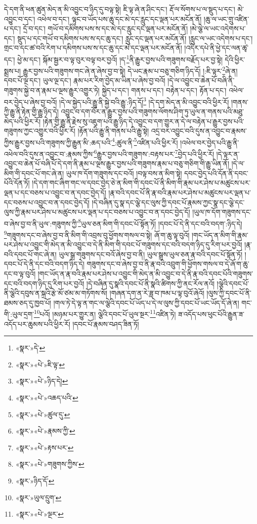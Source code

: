 དེ་དག་ནི་ཕན་ཚུན་མེད་ན་མི་འབྱུང་བ་ཉིད་དུ་བལྟ་སྟེ། ཇི་ལྟ་ཞེ་ན་ཤིང་དང་། རྡོ་ལ་སོགས་པ་ལ་སྡུད་པ་དང་། མེ་འབྱུང་བ་དང་། འཕེལ་བ་དང་། ལྟུང་བ་ཡོད་པས་ཆུ་དང་མེ་དང་རླུང་དང་ལྡན་པར་མངོན་ནོ། །ཆུ་ལ་ཡང་གྲུ་འཛིན་པ་དང་། དྲོ་བ་དང་། གཡོ་བ་དམིགས་པས་ས་དང་མེ་དང་རླུང་དང་ལྡན་པར་མངོན་ནོ། །མེ་ལྕེ་ལ་ཡང་འདེགས་པ་དང་། སྡུད་པ་དང་གཡོ་བ་དམིགས་པས་ས་དང་ཆུ་དང་། རླུང་དང་ལྡན་པར་མངོན་ནོ། །རླུང་ལ་ཡང་འདེགས་པ་དང་། གྲང་བ་དང་ཚ་བའི་རེག་པ་དམིགས་པས་ས་དང་ཆུ་དང་མེ་དང་ལྡན་པར་མངོན་ནོ། །འདིར་དཔེ་ནི་ཕྱེ་དང་ལན་ཚྭ་དང་། ཕྱེ་མ་དང་། སྐོམ་སྦྱར་བ་ལྟ་བུར་བལྟ་བར་བྱའོ། །ད་\footnote{«སྣར་»དེ་}ནི་རྒྱུར་བྱས་པའི་གཟུགས་བརྗོད་པར་བྱ་སྟེ། དེའི་ཕྱིར་སྨྲས་པ། རྒྱུར་བྱས་པའི་གཟུགས་གང་ཞེ་ན་ཞེས་བྱ་བ་སྟེ། དེ་ཡང་རྣམ་པ་བཅུ་གཅིག་ཉིད་དོ། །:ཇི་ལྟར་\footnote{«སྣར་»«པེ་»ཇི་ལྟ་}ཞེ་ན། དབང་པོ་ལྔ་དང་། ཡུལ་ལྔ་དང་། རྣམ་པར་རིག་བྱེད་མ་ཡིན་པ་ཞེས་བྱ་བའོ། །དེ་ལ་འབྱུང་བ་ཆེན་པོ་བཞི་ནི་གཟུགས་སྐྱེ་བ་ན་རྣམ་པ་ལྔས་རྒྱུར་འགྱུར་ཏེ། སྐྱེད་པ་དང་། གནས་པ་དང་། བརྟེན་པ་དང་། རྟོན་པ་དང་། འཕེལ་བར་བྱེད་པ་ཞེས་བྱ་བའོ། །དེ་ལ་སྐྱེད་པའི་རྒྱུ་ནི་སྐྱེ་བའི་རྒྱུ་:ཉིད་དོ།\footnote{«སྣར་»«པེ་»ཉིད་དེ།} །དེ་དག་མེད་ན་མི་འབྱུང་བའི་ཕྱིར་རོ། །གནས་ཀྱི་རྒྱུ་ནི་རྟེན་གྱི་རྒྱུ་ཉིད་དེ། འབྱུང་བ་དག་བོར་ན་རྒྱུར་བྱས་པའི་གཟུགས་ལོགས་ཤིག་ཏུ་ཡུལ་ན་གནས་པའི་མཐུ་མེད་པའི་ཕྱིར་རོ། །རྟེན་གྱི་རྒྱུ་ནི་རྗེས་སུ་འཇུག་པའི་རྒྱུ་ཉིད་དེ་འབྱུང་བ་དག་གྱུར་ན་དེ་ལ་བརྟེན་པ་རྒྱུར་བྱས་པའི་གཟུགས་ཀྱང་འགྱུར་བའི་ཕྱིར་རོ། །རྟོན་པའི་རྒྱུ་ནི་གནས་པའི་རྒྱུ་སྟེ། འདྲ་བར་འབྱུང་བའི་དུས་ན་འབྱུང་བ་རྣམས་ཀྱིས་རྒྱུར་བྱས་པའི་གཟུགས་ཀྱི་རྒྱུན་མི་:ཆད་པའི་\footnote{«སྣར་»«པེ་»འཆད་པའི་}:ཚུལ་ནི་\footnote{«སྣར་»«པེ་»ཚུལ་དུ་}འཛིན་པའི་ཕྱིར་རོ། །འཕེལ་བར་བྱེད་པའི་རྒྱུ་ནི་འཕེལ་བའི་དུས་ན་འབྱུང་བ་:རྣམས་ཀྱིས་\footnote{«སྣར་»«པེ་»རྣམས་ཀྱི་}རྒྱུར་བྱས་པའི་གཟུགས་:བརྟས་པར་\footnote{«སྣར་»«པེ་»རྟས་པར་}བྱེད་པའི་ཕྱིར་རོ། །དེ་ལྟར་ན་འབྱུང་བ་ཆེན་པོ་བཞི་པོ་དེ་དག་ནི་རྣམ་པ་ལྔས་རྒྱུར་བྱས་པའི་གཟུགས་རྣམ་པ་བཅུ་གཅིག་གི་རྒྱུ་ཡིན་ནོ། །དེ་ལ་མིག་གི་དབང་པོ་གང་ཞེ་ན། ཡུལ་ཁ་དོག་གཟུགས་དང་བའོ། །བལྟ་བས་ན་མིག་སྟེ། དབང་བྱེད་པའི་དོན་ནི་དབང་པོའི་དོན་ཏོ། །དེ་དག་གང་ཞིག་གང་ལ་དབང་བྱེད་ཅེ་ན་མིག་གི་དབང་པོ་ནི་མིག་གི་རྣམ་པར་ཤེས་པ་མཚུངས་པར་ལྡན་པ་དང་བཅས་པ་འབྱུང་བ་ན་དབང་བྱེད་དོ། །རྣ་བའི་དབང་པོ་ནི་རྣ་བའི་རྣམ་པར་ཤེས་པ་མཚུངས་པར་ལྡན་པ་དང་བཅས་པ་འབྱུང་བ་ན་དབང་བྱེད་དོ། །དེ་བཞིན་དུ་སྣ་དང་ལྕེ་དང་ལུས་ཀྱི་དབང་པོ་རྣམས་ཀྱང་སྣ་དང་ལྕེ་དང་ལུས་ཀྱི་རྣམ་པར་ཤེས་པ་མཚུངས་པར་ལྡན་པ་དང་བཅས་པ་འབྱུང་བ་ན་དབང་བྱེད་དོ། །ཡུལ་ཁ་དོག་གཟུགས་དང་བ་ཞེས་བྱ་བ་ནི་ཡུལ་:གཟུགས་ཀྱི་\footnote{«སྣར་»«པེ་»གཟུགས་ཀྱིས་}ཡུལ་ཅན་མིག་གི་དབང་པོ་སྟོན་ཏོ། །དབང་པོ་དེ་ནི་དང་བའི་བདག་:ཉིད་དེ། \footnote{«སྣར་»ཉིད་དོ་}གཟུགས་དང་བ་ཞེས་བྱ་བ་ནི་མིག་གི་འབྲས་བུ་ཕྱོགས་གསལ་བ་སྟེ། ཞོ་ག་ཆུ་ལྟ་བུའོ། །གང་ཡོད་ན་མིག་གི་རྣམ་པར་ཤེས་པ་འབྱུང་གི་མེད་ན་མི་འབྱུང་བ་དེ་ནི་མིག་གི་དབང་པོ་གཟུགས་དང་བའི་བདག་ཉིད་དུ་རིག་པར་བྱའོ། །རྣ་བའི་དབང་པོ་གང་ཞེ་ན། ཡུལ་སྒྲ་གཟུགས་དང་བའོ་ཞེས་བྱ་བ་ནི། ཡུལ་སྒྲས་ཡུལ་ཅན་རྣ་བའི་དབང་པོ་སྟོན་ཏོ། །དབང་པོ་དེ་ནི་དང་བའི་བདག་ཉིད་དེ། གཟུགས་དང་བ་ཞེས་བྱ་བ་ནི་རྣ་བའི་འབྲུག་གི་ཕྱོགས་གསལ་བ་དེ་ཞོ་ག་ཆུ་དང་བ་ལྟ་བུའོ། །གང་ཡོད་ན་རྣ་བའི་རྣམ་པར་ཤེས་པ་འབྱུང་གི་མེད་ན་མི་འབྱུང་བ་དེ་ནི་རྣ་བའི་དབང་པོའི་གཟུགས་དང་བའི་བདག་ཉིད་དུ་རིག་པར་བྱའོ། །དེ་བཞིན་དུ་སྣའི་དབང་པོ་ནི་སྣའི་ཚིགས་ཀྱི་ནང་རོལ་ནའོ། །ལྕེའི་དབང་པོ་ནི་ལྕེའི་དབུས་ན་སྐྲའི་རྩེ་མོ་ཙམ་མ་གཏོགས་སོ། །གཞན་དག་ན་རེ་ཟླ་བ་ཁམ་པ་ལྟ་བུའོ་ཞེའོ། །ལུས་ཀྱི་དབང་པོ་ནི་ཐམས་ཅད་དུ་ཁྱབ་པོ། །གལ་ཏེ་དེ་ལྟ་ན་གང་ལ་ལྕེའི་དབང་པོ་ཡོད་པ་དེ་ལ་ལུས་ཀྱི་དབང་པོ་ཡང་ཡོད་དོ་ཞེ་ན། གང་གི་:ཡུལ་དྲག་\footnote{«སྣར་»ཡུལ་དྲུག་}པའོ། །མཉམ་པར་གྱུར་ན། ལྕེའི་དབང་པོ་ཡུལ་སྔར་\footnote{«སྣར་»«པེ་»ལྔར་}འཛིན་ཏེ། ཟ་འདོད་པས་ཕུང་པོའི་རྒྱུན་ཟ་འདོད་པར་ཆུམས་པའི་ཕྱིར་རོ། །དབང་པོ་རྣམས་བཤད་ཟིན་ཏོ། 